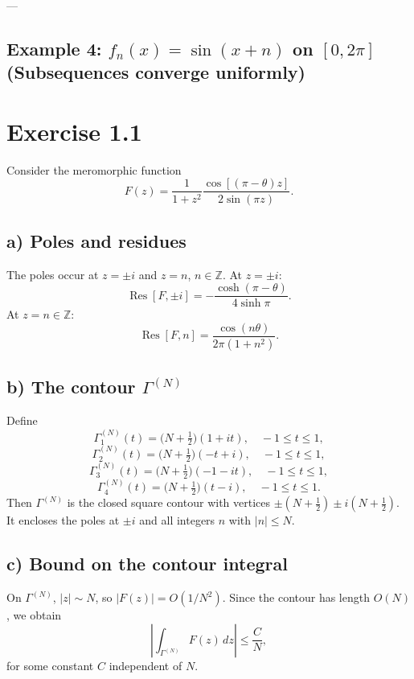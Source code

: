 \documentclass[11pt,a4paper]{article}
\begin{document}
	---
	
	\subsection*{Example 4: $f_n(x)=\sin(x+n)$ on $[0,2\pi]$ (Subsequences converge uniformly)}
	



\section*{Exercise 1.1}

Consider the meromorphic function
\[
F(z) = \frac{1}{1+z^2} \frac{\cos[(\pi-\theta)z]}{2\sin(\pi z)}.
\]

\subsection*{a) Poles and residues}
The poles occur at $z=\pm i$ and $z=n$, $n\in\mathbb{Z}$.  
At $z=\pm i$:
\[
\operatorname{Res}[F,\pm i] = -\frac{\cosh(\pi-\theta)}{4\sinh \pi}.
\]
At $z=n\in\mathbb{Z}$:
\[
\operatorname{Res}[F,n] = \frac{\cos(n\theta)}{2\pi(1+n^2)}.
\]

\subsection*{b) The contour $\Gamma^{(N)}$}
Define
\[
\Gamma^{(N)}_1(t) = \Big(N+\tfrac{1}{2}\Big)(1+it), \quad -1\leq t\leq 1,
\]
\[
\Gamma^{(N)}_2(t) = \Big(N+\tfrac{1}{2}\Big)(-t+i), \quad -1\leq t\leq 1,
\]
\[
\Gamma^{(N)}_3(t) = \Big(N+\tfrac{1}{2}\Big)(-1-it), \quad -1\leq t\leq 1,
\]
\[
\Gamma^{(N)}_4(t) = \Big(N+\tfrac{1}{2}\Big)(t-i), \quad -1\leq t\leq 1.
\]
Then $\Gamma^{(N)}$ is the closed square contour with vertices
$\pm(N+\tfrac{1}{2}) \pm i(N+\tfrac{1}{2})$.
It encloses the poles at $\pm i$ and all integers $n$ with $|n|\leq N$.

\subsection*{c) Bound on the contour integral}
On $\Gamma^{(N)}$, $|z|\sim N$, so $|F(z)|=O(1/N^2)$.  
Since the contour has length $O(N)$, we obtain
\[
\left| \int_{\Gamma^{(N)}} F(z)\,dz \right| \leq \frac{C}{N},
\]
for some constant $C$ independent of $N$.
\end{document}
